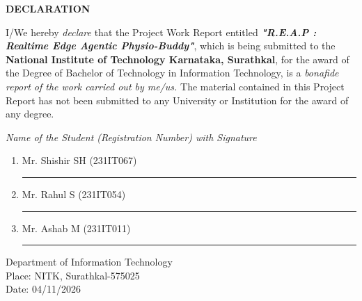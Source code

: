 \documentclass[12pt]{report}
\begin{document}
\begin{framed}
    \begin{center}
        \textbf{{\Large DECLARATION}}
    \end{center}
    \vspace{0.8em}
    I/We hereby \textit{declare} that the Project Work Report entitled \textit{\textbf{"R.E.A.P : Realtime Edge Agentic Physio-Buddy"}}, which is being submitted to the \textbf{National Institute of Technology Karnataka, Surathkal}, for the award of the Degree of Bachelor of Technology in Information Technology, is a \textit{bonafide report of the work carried out by me/us.} The material contained in this Project Report has not been submitted to any University or Institution for the award of any degree.
    \vspace{1.5em}

    \textit{Name of the Student (Registration Number) with Signature}
    \begin{enumerate}[label={(\arabic*)}]
        \setlength{\itemsep}{0.8em}
        \item Mr. Shishir SH (231IT067) \hfill \rule{4.5cm}{0.4pt}
        \item Mr. Rahul S (231IT054) \hfill \rule{4.5cm}{0.4pt}
        \item Mr. Ashab M (231IT011) \hfill \rule{4.5cm}{0.4pt}
    \end{enumerate}
    \vspace{2.2em}

    Department of Information Technology \\
    Place: NITK, Surathkal-575025 \\
    Date: 04/11/2026
    \vspace{1.8em}
\end{framed}
\clearpage
\end{document}

